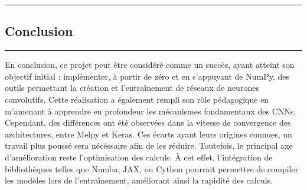 {\color{gray}\hrule}
\begin{center}
\section{Conclusion}
\bigskip
\end{center}
{\color{gray}\hrule}
\vspace{0.5cm}

En conclusion, ce projet peut être considéré comme un succès, ayant atteint son objectif initial : 
implémenter, à partir de zéro et en s’appuyant de NumPy, des outils permettant la création et 
l’entraînement de réseaux de neurones convolutifs. Cette réalisation a également rempli son rôle 
pédagogique en m’amenant à apprendre en profondeur les mécanismes fondamentaux des CNNs. \\

Cependant, des différences ont été observées dans la vitesse de convergence des architectures, 
entre Melpy et Keras. Ces écarts ayant leurs origines connues, un travail plus poussé 
sera nécéssaire afin de les réduire. Toutefois, le principal axe d’amélioration reste l’optimisation des calculs. 
À cet effet, l’intégration de bibliothèques telles que Numba, JAX, ou Cython pourrait permettre de compiler les 
modèles lors de l’entraînement, améliorant ainsi la rapidité des calculs. 